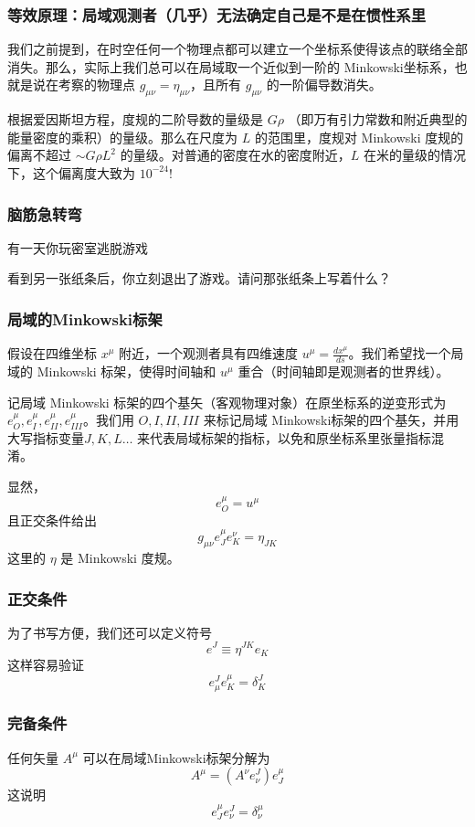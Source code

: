 \documentclass[CJK,13pt]{beamer}
\date{}
\begin{document}
  \bch


  \begin{frame}
    \frametitle{等效原理：局域观测者（几乎）无法确定自己是不是在惯性系里}
    我们之前提到，在时空任何一个物理点都可以建立一个坐标系使得该点的联络全部消失。那么，实际上我们总可以在局域取一个近似到一阶的 Minkowski坐标系，也就是说在考察的物理点 $g_{\mu\nu} = \eta_{\mu\nu}$，且所有 $g_{\mu\nu}$ 的一阶偏导数消失。


    \skiplines
    
    根据爱因斯坦方程，度规的二阶导数的量级是 $G\rho$ （即万有引力常数和附近典型的能量密度的乘积）的量级。那么在尺度为 $L$ 的范围里，度规对 Minkowski 度规的偏离不超过
$\sim G\rho L^2$ 的量级。对普通的密度在水的密度附近，$L$ 在米的量级的情况下，这个偏离度大致为 $10^{-24}$!  
  \end{frame}
  

  \begin{frame}
    \frametitle{脑筋急转弯}
    有一天你玩密室逃脱游戏
    
    
    看到另一张纸条后，你立刻退出了游戏。请问那张纸条上写着什么？
  \end{frame}
  
  \begin{frame}
    \frametitle{局域的Minkowski标架}
    假设在四维坐标 $x^\mu$ 附近，一个观测者具有四维速度 $u^\mu = \frac{dx^\mu}{ds}$。我们希望找一个局域的 Minkowski 标架，使得时间轴和 $u^\mu$ 重合（时间轴即是观测者的世界线）。

    \skipline

    记局域 Minkowski 标架的四个基矢（客观物理对象）在原坐标系的逆变形式为 $e_{O}^\mu , e_{I}^\mu, e_{II}^\mu, e_{III}^\mu$。我们用 $O, I, II, III$ 来标记局域 Minkowski标架的四个基矢，并用大写指标变量$J,K,L\ldots$ 来代表局域标架的指标，以免和原坐标系里张量指标混淆。

    显然，
    $$e_O^\mu = u^\mu$$
    且正交条件给出
    $$ g_{\mu\nu} e_J^\mu e_K^\nu = \eta_{JK}$$
    这里的 $\eta$ 是 Minkowski 度规。
  \end{frame}

  
  \begin{frame}
    \frametitle{正交条件}
    为了书写方便，我们还可以定义符号 
    $$ e^J \equiv \eta^{JK}e_K$$
    这样容易验证
    {\blue $$ e^J_\mu e^\mu_K = \delta^J_K$$}
  \end{frame}
  

  \begin{frame}
    \frametitle{完备条件}
    任何矢量 $A^\mu$ 可以在局域Minkowski标架分解为
    $$ A^\mu = (A^\nu e_\nu^J)e_J^\mu $$
    这说明
    {\blue $$ e_J^\mu e^J_\nu = \delta^\mu_\nu$$}
  \end{frame}
\end{document}
